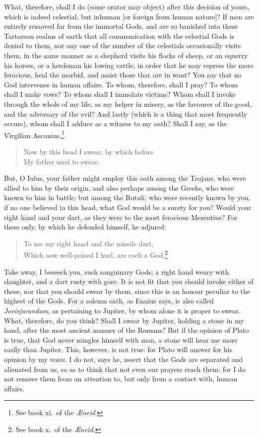 \documentclass{article}
\begin{document}
What, therefore, shall I do (some orator may object) after this decision of
yours, which is indeed celestial, but inhuman [or foreign from human nature]?
If men are entirely removed far from the immortal Gods, and are so banished
into these Tartarean realms of earth that all communication with the celestial
Gods is denied to them, nor any one of the number of the celestials
occasionally visits them, in the same manner as a shepherd visits his flocks of
sheep, or an equerry his horses, or a herdsman his lowing cattle, in order that
he may repress the more ferocious, heal the morbid, and assist those that are
in want? You say that no God intervenes in human affairs. To whom, therefore,
shall I pray? To whom shall I make vows? To whom shall I immolate victims? Whom
shall I invoke through the whole of my life, as my helper in misery, as the
favourer of the good, and the adversary of the evil? And lastly (which is a
thing that most frequently occurs), whom shall I adduce as a witness to my
oath? Shall I say, as the Virgilian Ascanius,\footnote{See book xi.~of the
\textit{{\AE}neid}.}

\begin{verse}
Now by this head I swear, by which before\\
My father used to swear.
\end{verse}

\noindent But, O Iulus, your father might employ this oath among the Trojans,
who were allied to him by their origin, and also perhaps among the Greeks, who
were known to him in battle; but among the Rutuli, who were recently known by
you, if no one believed in this head, what God would be a surety for you? Would
your right hand and your dart, as they were to the most ferocious Mezentius?
For these only, by which he defended himself, he adjured:

\begin{verse}
To me my right hand and the missile dart,\\
Which now well-poised I hurl, are each a God.\footnote{See book x.~of the
\textit{{\AE}neid}.}
\end{verse}

\noindent Take away, I beseech you, such sanguinary Gods; a right hand weary
with slaughter, and a dart rusty with gore. It is not fit that you should
invoke either of these, nor that you should swear by them, since this is an
honour peculiar to the highest of the Gods. For a solemn oath, as Ennius says,
is also called \textit{Jovisjurandum}, as pertaining to Jupiter, by whom alone
it is proper to swear. What, therefore, do you think? Shall I swear by Jupiter,
holding a stone in my hand, after the most ancient manner of the Romans? But if
the opinion of Plato is true, that God never mingles himself with man, a stone
will hear me more easily than Jupiter. This, however, is not true: for Plato
will answer for his opinion by my voice. I do not, says he, assert that the
Gods are separated and alienated from us, so as to think that not even our
prayers reach them; for I do not remove them from an attention to, but only
from a contact with, human affairs.
\end{document}

